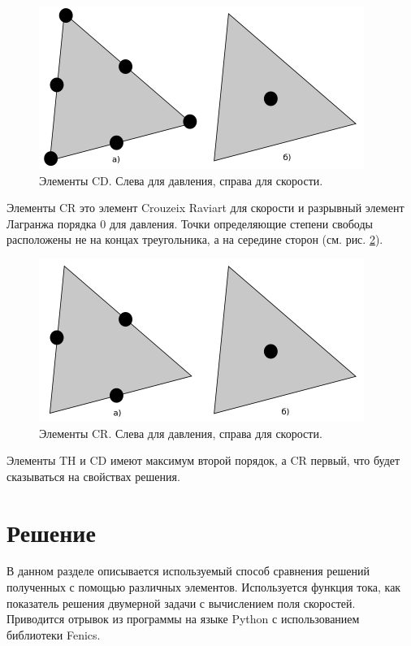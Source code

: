 \documentclass[12pt]{article}
\begin{document}
\begin{figure}
	\begin{center}
		\includegraphics[width=400px]{pics/CD}
		\caption{Элементы CD. Слева для давления, справа для скорости.}
		\label{fg:cd}
	\end{center}
\end{figure}

Элементы CR это элемент Crouzeix Raviart для скорости и разрывный элемент Лагранжа порядка 0 для давления. Точки определяющие степени свободы расположены не на концах треугольника, а на середине сторон (см. рис. \ref{fg:cr}).

\begin{figure}
	\begin{center}
		\includegraphics[width=400px]{pics/CR}
		\caption{Элементы CR. Слева для давления, справа для скорости.}
		\label{fg:cr}
	\end{center}
\end{figure}

Элементы TH и CD имеют максимум второй порядок, а CR первый, что будет сказываться на свойствах решения.

\section{Решение}
В данном разделе описывается используемый способ сравнения решений полученных с помощью различных элементов. Используется функция тока, как показатель решения двумерной задачи с вычислением поля скоростей. Приводится отрывок из программы на языке Python с использованием библиотеки Fenics.
\end{document}
